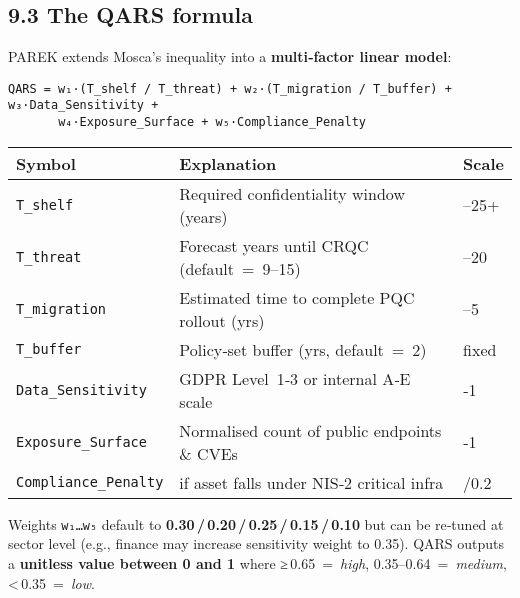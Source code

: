 \documentclass[
  english,
]{article}
\begin{document}
\subsection{9.3 The QARS formula}\label{the-qars-formula}

PAREK extends Mosca's inequality into a \textbf{multi‑factor linear
model}:

\begin{verbatim}
QARS = w₁·(T_shelf / T_threat) + w₂·(T_migration / T_buffer) + w₃·Data_Sensitivity +
       w₄·Exposure_Surface + w₅·Compliance_Penalty
\end{verbatim}

\begin{longtable}[]{@{}
  >{\raggedright\arraybackslash}p{}
  >{\raggedright\arraybackslash}p{}
  >{\raggedright\arraybackslash}p{}@{}}
\toprule\noalign{}
\begin{minipage}[b]{\linewidth}\raggedright
Symbol
\end{minipage} & \begin{minipage}[b]{\linewidth}\raggedright
Explanation
\end{minipage} & \begin{minipage}[b]{\linewidth}\raggedright
Scale
\end{minipage} \\
\midrule\noalign{}
\endhead
\bottomrule\noalign{}
\endlastfoot
\texttt{T\_shelf} & Required confidentiality window (years) & 0--25+ \\
\texttt{T\_threat} & Forecast years until CRQC (default~=~9--15) &
0--20 \\
\texttt{T\_migration} & Estimated time to complete PQC rollout (yrs) &
0--5 \\
\texttt{T\_buffer} & Policy‑set buffer (yrs, default~=~2) & fixed \\
\texttt{Data\_Sensitivity} & GDPR Level~1‑3 or internal A‑E scale &
0.1‑1 \\
\texttt{Exposure\_Surface} & Normalised count of public endpoints \&
CVEs & 0‑1 \\
\texttt{Compliance\_Penalty} & 0.2 if asset falls under NIS‑2 critical
infra & 0/0.2 \\
\end{longtable}

Weights \texttt{w₁…w₅} default to
\textbf{0.30\,/\,0.20\,/\,0.25\,/\,0.15\,/\,0.10} but can be re‑tuned at
sector level (e.g., finance may increase sensitivity weight to 0.35).
QARS outputs a \textbf{unitless value between 0 and 1} where
≥\,0.65~=~\emph{high}, 0.35--0.64~=~\emph{medium},
\textless\,0.35~=~\emph{low}.
\end{document}
